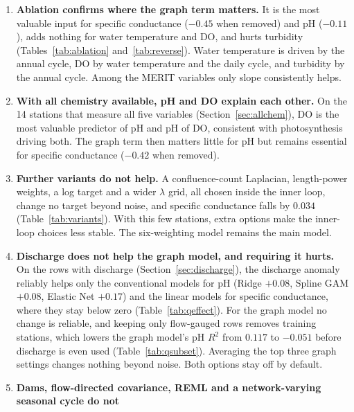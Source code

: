\documentclass[11pt]{article}
\begin{document}
\begin{enumerate}
        model (Table~\ref{tab:final}), the graph-Laplacian model is clearly the best choice for
        specific conductance ($+0.36$ over the next model) and pH ($+0.10$). It is no better than
        simpler models for water temperature and DO. For turbidity, gradient boosting is the model
        to use.
  \item \textbf{Ablation confirms where the graph term matters.} It is the most valuable input for
        specific conductance ($-0.45$ when removed) and pH ($-0.11$), adds nothing for water
        temperature and DO, and hurts turbidity (Tables~\ref{tab:ablation} and~\ref{tab:reverse}).
        Water temperature is driven by the annual cycle, DO by water temperature and the daily
        cycle, and turbidity by the annual cycle. Among the MERIT variables only slope consistently
        helps.
  \item \textbf{With all chemistry available, pH and DO explain each other.} On the 14 stations that
        measure all five variables (Section~\ref{sec:allchem}), DO is the most valuable predictor of
        pH and pH of DO, consistent with photosynthesis driving both. The graph term then matters
        little for pH but remains essential for specific conductance ($-0.42$ when removed).
  \item \textbf{Further variants do not help.} A confluence-count Laplacian, length-power weights, a
        log target and a wider $\lambda$ grid, all chosen inside the inner loop, change no target
        beyond noise, and specific conductance falls by $0.034$ (Table~\ref{tab:variants}). With this
        few stations, extra options make the inner-loop choices less stable. The six-weighting model
        remains the main model.
  \item \textbf{Discharge does not help the graph model, and requiring it hurts.} On the rows with
        discharge (Section~\ref{sec:discharge}), the discharge anomaly reliably helps only the
        conventional models for pH (Ridge $+0.08$, Spline GAM $+0.08$, Elastic Net $+0.17$) and the
        linear models for specific conductance, where they stay below zero
        (Table~\ref{tab:qeffect}). For the graph model no change is reliable, and keeping only
        flow-gauged rows removes training stations, which lowers the graph model's pH $R^2$ from $0.117$ to
        $-0.051$ before discharge is even used (Table~\ref{tab:qsubset}). Averaging the top three
        graph settings changes nothing beyond noise. Both options stay off by default.
  \item \textbf{Dams, flow-directed covariance, REML and a network-varying seasonal cycle do not
}
\end{enumerate}
\end{document}
